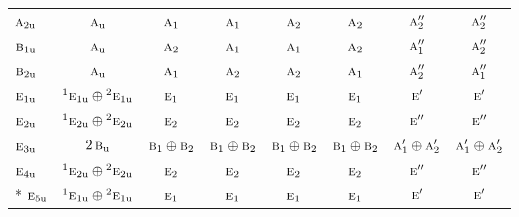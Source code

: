 \documentclass[10pt,a4paper]{article}
\numberwithin{equation}{section}
\newcommand{\irr}[1]{\text{\normalfont\scshape #1}}
\newcommand{\conjpair}[1]{{}^{#1}}
\newcommand{\ptag}[1]{\mathrm{#1}}
\begin{document}
{\begin{longtable}{@{}lccccccc@{}}
$\irr{a}_{2\ptag{u}}$ & $\irr{a}_{\ptag{u}}$ & $\irr{a}_{1}$ & $\irr{a}_{1}$ & $\irr{a}_{2}$ & $\irr{a}_{2}$ & $\irr{a}_{2}''$ & $\irr{a}_{2}''$\\
$\irr{b}_{1\ptag{u}}$ & $\irr{a}_{\ptag{u}}$ & $\irr{a}_{2}$ & $\irr{a}_{1}$ & $\irr{a}_{1}$ & $\irr{a}_{2}$ & $\irr{a}_{1}''$ & $\irr{a}_{2}''$\\
$\irr{b}_{2\ptag{u}}$ & $\irr{a}_{\ptag{u}}$ & $\irr{a}_{1}$ & $\irr{a}_{2}$ & $\irr{a}_{2}$ & $\irr{a}_{1}$ & $\irr{a}_{2}''$ & $\irr{a}_{1}''$\\
$\irr{e}_{1\ptag{u}}$ & $\conjpair{1}\irr{e}_{1\ptag{u}}\oplus \conjpair{2}\irr{e}_{1\ptag{u}}$ & $\irr{e}_{1}$ & $\irr{e}_{1}$ & $\irr{e}_{1}$ & $\irr{e}_{1}$ & $\irr{e}'$ & $\irr{e}'$\\
$\irr{e}_{2\ptag{u}}$ & $\conjpair{1}\irr{e}_{2\ptag{u}}\oplus \conjpair{2}\irr{e}_{2\ptag{u}}$ & $\irr{e}_{2}$ & $\irr{e}_{2}$ & $\irr{e}_{2}$ & $\irr{e}_{2}$ & $\irr{e}''$ & $\irr{e}''$\\
$\irr{e}_{3\ptag{u}}$ & $2\,\irr{b}_{\ptag{u}}$ & $\irr{b}_{1}\oplus \irr{b}_{2}$ & $\irr{b}_{1}\oplus \irr{b}_{2}$ & $\irr{b}_{1}\oplus \irr{b}_{2}$ & $\irr{b}_{1}\oplus \irr{b}_{2}$ & $\irr{a}_{1}'\oplus \irr{a}_{2}'$ & $\irr{a}_{1}'\oplus \irr{a}_{2}'$\\
$\irr{e}_{4\ptag{u}}$ & $\conjpair{1}\irr{e}_{2\ptag{u}}\oplus \conjpair{2}\irr{e}_{2\ptag{u}}$ & $\irr{e}_{2}$ & $\irr{e}_{2}$ & $\irr{e}_{2}$ & $\irr{e}_{2}$ & $\irr{e}''$ & $\irr{e}''$\\*
$\irr{e}_{5\ptag{u}}$ & $\conjpair{1}\irr{e}_{1\ptag{u}}\oplus \conjpair{2}\irr{e}_{1\ptag{u}}$ & $\irr{e}_{1}$ & $\irr{e}_{1}$ & $\irr{e}_{1}$ & $\irr{e}_{1}$ & $\irr{e}'$ & $\irr{e}'$\\
\bottomrule\end{longtable}}
\end{document}
